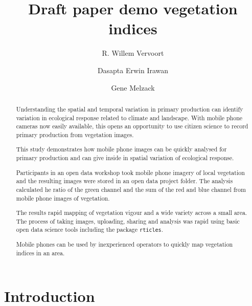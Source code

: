 \documentclass[]{elsarticle} %
\begin{document}
\begin{frontmatter}

  \title{Draft paper demo vegetation indices}
    \author[a]{R. Willem Vervoort}
    \author[b]{Dasapta Erwin Irawan}
  
    \author[c]{Gene Melzack}
  
      \address[a]{Sydney Institute of Agriculture, The University of Sydney, NSW 2006}
    \address[b]{Applied Geology Research Group, Faculty of Earth Sciences and
Technology, Institut Teknologi Bandung, Jl. Ganesa No.10, Lb. Siliwangi,
Coblong, Kota Bandung, Jawa Barat 40132, Indonesia}
    \address[c]{Research Data Team, The University of Sydney Library, The University of
Sydney, NSW 2006}
  
  \begin{abstract}
  Understanding the spatial and temporal variation in primary production
  can identify variation in ecological response related to climate and
  landscape. With mobile phone cameras now easily available, this opens an
  opportunity to use citizen science to record primary production from
  vegetation images.
  
  This study demonstrates how mobile phone images can be quickly analysed
  for primary production and can give inside in spatial variation of
  ecological response.
  
  Participants in an open data workshop took mobile phone imagery of local
  vegetation and the resulting images were stored in an open data project
  folder. The analysis calculated he ratio of the green channel and the
  sum of the red and blue channel from mobile phone images of vegetation.
  
  The results rapid mapping of vegetation vigour and a wide variety across
  a small area. The process of taking images, uploading, sharing and
  analysis was rapid using basic open data science tools including the
  package \texttt{rticles}.
  
  Mobile phones can be used by inexperienced operators to quickly map
  vegetation indices in an area.
  \end{abstract}
  
 \end{frontmatter}

\section{Introduction}\label{introduction}
\end{document}
